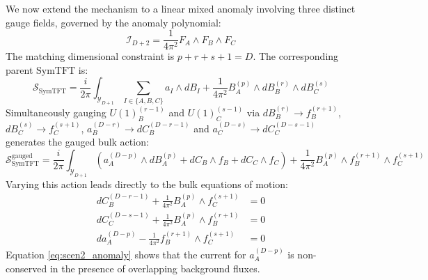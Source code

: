 \documentclass[aps,preprint,nofootinbib,preprintnumbers,eqsecnum,superscriptaddress]{revtex4}
\numberwithin{equation}{section}
\begin{document}
We now extend the mechanism to a linear mixed anomaly involving three distinct gauge fields, governed by the anomaly polynomial:
\begin{equation}
    \mathcal{I}_{D+2} = \frac{1}{4\pi^2} F_A \wedge F_B \wedge F_C
\end{equation}
The matching dimensional constraint is $p + r + s + 1 = D$. The corresponding parent $\text{SymTFT}$ is:
\begin{equation}
    \mathcal{S}_{\text{SymTFT}} = \frac{i}{2\pi} \int_{\mathcal{Y}_{D+1}} \sum_{I \in \{A,B,C\}} a_I \wedge d B_I + \frac{1}{4\pi^2} B^{(p)}_A \wedge d B^{(r)}_B \wedge d B^{(s)}_C
\end{equation}
Simultaneously gauging $U(1)^{(r-1)}_B$ and $U(1)^{(s-1)}_C$ via $dB^{(r)}_B \to f^{(r+1)}_B$, $dB^{(s)}_C \to f^{(s+1)}_C$, $a^{(D-r)}_B \to dC^{(D-r-1)}_B$ and $a^{(D-s)}_C \to dC^{(D-s-1)}_C$ generates the gauged bulk action:
\begin{equation}
    \mathcal{S}^\text{gauged}_{\text{SymTFT}} = \frac{i}{2\pi} \int_{\mathcal{Y}_{D+1}} \left( a^{(D-p)}_A \wedge d B^{(p)}_A + dC_B \wedge f_B + dC_C \wedge f_C \right) + \frac{1}{4\pi^2} B^{(p)}_A \wedge f^{(r+1)}_B \wedge f^{(s+1)}_C
\end{equation}
Varying this action leads directly to the bulk equations of motion:
\begin{align}
    dC^{(D-r-1)}_B + \frac{1}{4\pi^2} B^{(p)}_A \wedge f^{(s+1)}_C &= 0 \\
    dC^{(D-s-1)}_C + \frac{1}{4\pi^2} B^{(p)}_A \wedge f^{(r+1)}_B &= 0 \\
    da^{(D-p)}_A - \frac{1}{4\pi^2} f^{(r+1)}_B \wedge f^{(s+1)}_C &= 0 \label{eq:scen2_anomaly}
\end{align}
Equation \eqref{eq:scen2_anomaly} shows that the current for $a^{(D-p)}_A$ is non-conserved in the presence of overlapping background fluxes. 
\end{document}
